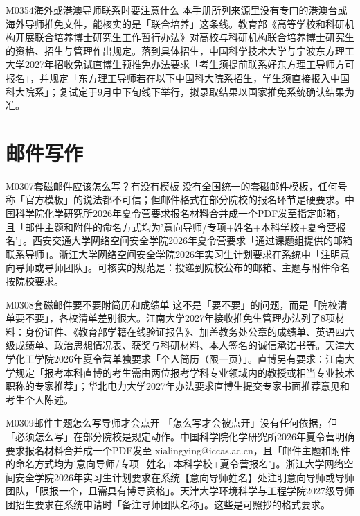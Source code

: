 \begin{qa}{M0354}{海外或港澳导师联系时要注意什么}
本手册所列来源里没有专门的港澳台或海外导师推免文件，能核实的是「联合培养」这条线。教育部《高等学校和科研机构开展联合培养博士研究生工作暂行办法》对高校与科研机构联合培养博士研究生的资格、招生与管理作出规定。落到具体招生，中国科学技术大学与宁波东方理工大学2027年招收免试直博生预推免办法要求「考生须提前联系好东方理工导师方可报名」，并规定「东方理工导师若在以下中国科大院系招生，学生须直接报入中国科大院系」；复试定于9月中下旬线下举行，拟录取结果以国家推免系统确认结果为准。
\end{qa}

\section{邮件写作}
\begin{qa}{M0307}{套磁邮件应该怎么写？有没有模板}
没有全国统一的套磁邮件模板，任何号称「官方模板」的说法都不可信；但邮件格式在部分院校的报名环节是硬要求。中国科学院化学研究所2026年夏令营要求报名材料合并成一个PDF发至指定邮箱，且「邮件主题和附件的命名方式均为'意向导师/专项+姓名+本科学校+夏令营报名'」。西安交通大学网络空间安全学院2026年夏令营要求「通过课题组提供的邮箱联系导师」。浙江大学网络空间安全学院2026年实习生计划要求在系统中「注明意向导师或导师团队」。可核实的规范是：投递到院校公布的邮箱、主题与附件命名按院校要求。
\end{qa}

\begin{qa}{M0308}{套磁邮件要不要附简历和成绩单}
这不是「要不要」的问题，而是「院校清单要不要」，各校清单差别很大。江南大学2027年接收推免生管理办法列了8项材料：身份证件、《教育部学籍在线验证报告》、加盖教务处公章的成绩单、英语四六级成绩单、政治思想情况表、获奖与科研材料、本人签名的诚信承诺书等。天津大学化工学院2026年夏令营单独要求「个人简历（限一页）」。直博另有要求：江南大学规定「报考本科直博的考生需由两位报考学科专业领域内的教授或相当专业技术职称的专家推荐」；华北电力大学2027年办法要求直博生提交专家书面推荐意见和考生个人陈述。
\end{qa}

\begin{qa}{M0309}{邮件主题怎么写导师才会点开}
「怎么写才会被点开」没有任何依据，但「必须怎么写」在部分院校是规定动作。中国科学院化学研究所2026年夏令营明确要求报名材料合并成一个PDF发至 xialingying@iccas.ac.cn，且「邮件主题和附件的命名方式均为'意向导师/专项+姓名+本科学校+夏令营报名'」。浙江大学网络空间安全学院2026年实习生计划要求在系统{\zhhei 【意向导师姓名】}处注明意向导师或导师团队，「限报一个，且需具有博导资格」。天津大学环境科学与工程学院2027级导师团招生要求在系统申请时「备注导师团队名称」。这些是可照抄的格式要求。
\end{qa}

